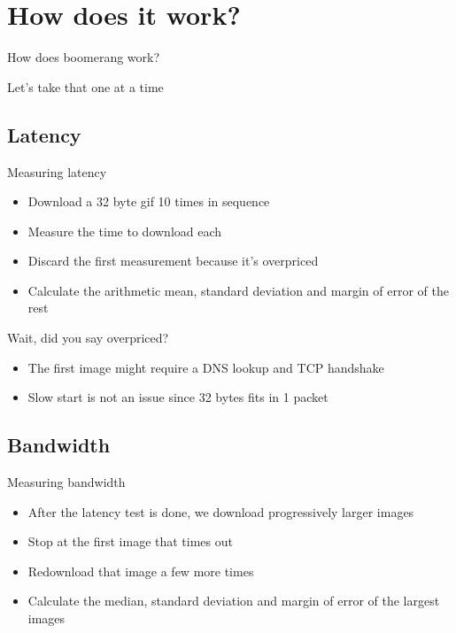 \documentclass{beamer}
\begin{document}
\section{How does it work?}
\label{sec:internals}

\begin{frame}{}
  \begin{center}
  How does boomerang work?
  \end{center}
\end{frame}

\begin{frame}{}
  \begin{center}
  Let's take that one at a time
  \end{center}
\end{frame}

\subsection{Latency}
\begin{frame}{Measuring latency}
  \begin{itemize}
  \item Download a 32 byte gif 10 times in sequence
  \item Measure the time to download each
  \item Discard the first measurement because it's overpriced
  \item Calculate the arithmetic mean, standard deviation and margin of error of the rest
  \end{itemize}
\end{frame}

\begin{frame}{Wait, did you say overpriced?}
  \begin{itemize}
  \item The first image might require a DNS lookup and TCP handshake
  \item Slow start is not an issue since 32 bytes fits in 1 packet
  \end{itemize}
\end{frame}

\subsection{Bandwidth}
\begin{frame}{Measuring bandwidth}
  \begin{itemize}
  \item After the latency test is done, we download progressively larger images
  \item Stop at the first image that times out
  \item Redownload that image a few more times
  \item Calculate the median, standard deviation and margin of error of the largest images
  \end{itemize}
\end{frame}
\end{document}
